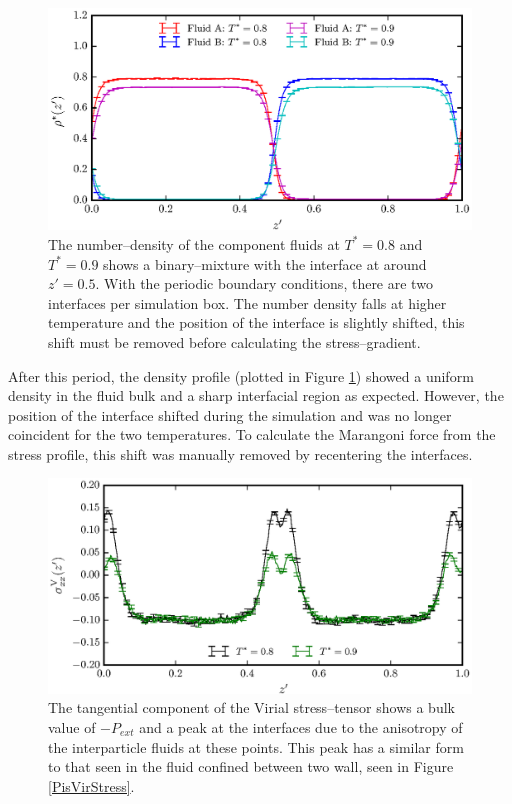 \begin{figure}[h]
\centering
\includegraphics[scale=0.8]{Period10Rho}
\caption{The number--density of the component fluids at $T^{*}=0.8$ and $T^{*}=0.9$ shows a binary--mixture with the interface at around $z'=0.5$.
With the periodic boundary conditions, there are two interfaces per simulation box.
The number density falls at higher temperature and the position of the interface is slightly shifted, this shift must be removed before calculating the stress--gradient.}
\label{Period10Rho}
\end{figure}
After this period, the density profile (plotted in Figure \ref{Period10Rho}) showed a uniform density in the fluid bulk and a sharp interfacial region as expected.
However, the position of the interface shifted during the simulation and was no longer coincident for the two temperatures.
To calculate the Marangoni force from the stress profile, this shift was manually removed by recentering the interfaces.
\FloatBarrier

\begin{figure}[h]
\centering
\includegraphics[scale=0.8]{Period10VirStress}
\caption{The tangential component of the Virial stress--tensor shows a bulk value of $-P_{ext}$ and a peak at the interfaces due to the anisotropy of the interparticle fluids at these points.
This peak has a similar form to that seen in the fluid confined between two wall, seen in Figure \ref{PisVirStress}.
}
\label{Period10VirStress}
\end{figure}

